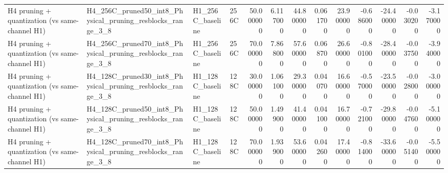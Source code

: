 \begin{table}
\begin{tabular}{llllrrrrrrrrr}
H4 pruning + quantization (vs same-channel H1) & H4\_256C\_pruned50\_int8\_Physical\_pruning\_resblocks\_range\_3\_8 & H1\_256C\_baseline & 256C & 50.000000 & 6.117000 & 44.800000 & 0.061700 & 23.900000 & -0.686000 & -24.400000 & -0.030200 & -3.170000 \\
H4 pruning + quantization (vs same-channel H1) & H4\_256C\_pruned70\_int8\_Physical\_pruning\_resblocks\_range\_3\_8 & H1\_256C\_baseline & 256C & 70.000000 & 7.868000 & 57.600000 & 0.068700 & 26.600000 & -0.801000 & -28.400000 & -0.037500 & -3.940000 \\
H4 pruning + quantization (vs same-channel H1) & H4\_128C\_pruned30\_int8\_Physical\_pruning\_resblocks\_range\_3\_8 & H1\_128C\_baseline & 128C & 30.000000 & 1.061000 & 29.300000 & 0.040700 & 16.600000 & -0.570000 & -23.500000 & -0.028000 & -3.000000 \\
H4 pruning + quantization (vs same-channel H1) & H4\_128C\_pruned50\_int8\_Physical\_pruning\_resblocks\_range\_3\_8 & H1\_128C\_baseline & 128C & 50.000000 & 1.499000 & 41.400000 & 0.041000 & 16.700000 & -0.721000 & -29.800000 & -0.047600 & -5.100000 \\
H4 pruning + quantization (vs same-channel H1) & H4\_128C\_pruned70\_int8\_Physical\_pruning\_resblocks\_range\_3\_8 & H1\_128C\_baseline & 128C & 70.000000 & 1.939000 & 53.600000 & 0.042600 & 17.400000 & -0.814000 & -33.600000 & -0.051400 & -5.500000 \\
\bottomrule
\end{tabular}
\end{table}
